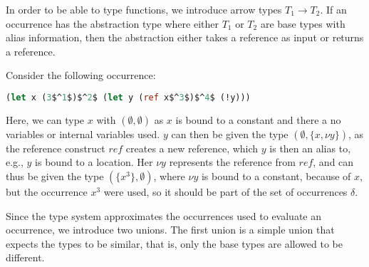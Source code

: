 \documentclass[acmsmall,sigplan]{acmart}
\begin{document}
In order to be able to type functions, we introduce arrow types
$T_1 \rightarrow T_2$. If an occurrence has the
abstraction type where either $T_1$ or $T_2$ are base types with alias
information, then the abstraction either takes a reference as input or
returns a reference.

\begin{example}[]
Consider the following occurrence:
\begin{lstlisting}[language=Caml, mathescape=true]
(let x (3$^1$)$^2$ (let y (ref x$^3$)$^4$ (!y)))
\end{lstlisting}
Here, we can type $x$ with $(\emptyset,\emptyset)$ as $x$ is bound to a constant and there a no variables or internal variables used.
$y$ can then be given the type $(\emptyset,\{x,\nu y\})$, as the reference construct $ref$ creates a new reference, which $y$ is then an alias to, e.g., $y$ is bound to a location.
Her $\nu y$ represents the reference from $ref$, and can thus be given the type $(\{x^3\},\emptyset)$, where $\nu y$ is bound to a constant, because of $x$, but the occurrence $x^3$ were used, so it should be part of the set of occurrences $\delta$.
\end{example}

Since the type system approximates the occurrences used to evaluate an occurrence, we introduce two unions.
The first union is a simple union that expects the types to be similar, that is, only the base types are allowed to be different.
\end{document}
